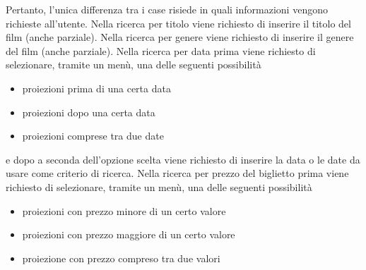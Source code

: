 \documentclass[a4paper,titlepage,openany,12pt]{book}
\begin{document}
Pertanto, l’unica differenza tra i case risiede in quali informazioni vengono richieste all’utente.
Nella ricerca per titolo viene richiesto di inserire il titolo del film (anche parziale).
Nella ricerca per genere viene richiesto di inserire il genere del film (anche parziale).
Nella ricerca per data prima viene richiesto di selezionare, tramite un menù, una delle seguenti possibilità

\begin{center}
\begin{varwidth}{\textwidth}
\begin{itemize}
\item[•] proiezioni prima di una certa data
\item[•] proiezioni dopo una certa data
\item[•] proiezioni comprese tra due date
\end{itemize}
\end{varwidth}
\end{center}

e dopo a seconda dell’opzione scelta viene richiesto di inserire la data o le date da usare come criterio di ricerca.
Nella ricerca per prezzo del biglietto prima viene richiesto di selezionare, tramite un menù, una delle seguenti possibilità

\begin{center}
\begin{varwidth}{\textwidth}
\begin{itemize}
\item[•] proiezioni con prezzo minore di un certo valore
\item[•] proiezioni con prezzo maggiore di un certo valore
\item[•] proiezione con prezzo compreso tra due valori
\end{itemize}
\end{varwidth}
\end{center}
\end{document}
